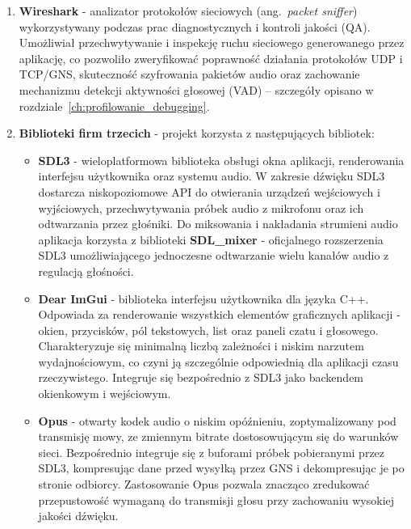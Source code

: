 \begin{enumerate}
	\item \textbf{Wireshark} \cite{wireshark_doc} - analizator protokołów sieciowych
	(ang.~\textit{packet sniffer}) wykorzystywany podczas prac diagnostycznych i kontroli
	jakości (QA). Umożliwiał przechwytywanie i inspekcję ruchu sieciowego generowanego
	przez aplikację, co pozwoliło zweryfikować poprawność działania protokołów UDP i TCP/GNS,
	skuteczność szyfrowania pakietów audio oraz zachowanie mechanizmu detekcji aktywności
	głosowej (VAD) -- szczegóły opisano w rozdziale~\ref{ch:profilowanie_debugging}.

	\item \textbf{Biblioteki firm trzecich} - projekt korzysta z następujących bibliotek:
	\begin{itemize}
		\item \textbf{SDL3} \cite{SDL3} - wieloplatformowa biblioteka obsługi okna aplikacji,
		renderowania interfejsu użytkownika oraz systemu audio. W zakresie dźwięku
		SDL3 dostarcza niskopoziomowe API do otwierania urządzeń wejściowych
		i wyjściowych, przechwytywania próbek audio z mikrofonu oraz ich odtwarzania
		przez głośniki. Do miksowania i nakładania strumieni audio aplikacja korzysta
		z biblioteki \textbf{SDL\_mixer} \cite{SDLMixer} - oficjalnego rozszerzenia SDL3
		umożliwiającego jednoczesne odtwarzanie wielu kanałów audio z regulacją głośności.
		
		\item \textbf{Dear ImGui} \cite{ImGui} - biblioteka interfejsu użytkownika
		dla języka C++. Odpowiada za renderowanie
		wszystkich elementów graficznych aplikacji - okien, przycisków, pól tekstowych,
		list oraz paneli czatu i głosowego. Charakteryzuje się minimalną liczbą
		zależności i niskim narzutem wydajnościowym, co czyni ją szczególnie
		odpowiednią dla aplikacji czasu rzeczywistego. Integruje się bezpośrednio
		z SDL3 jako backendem okienkowym i wejściowym.
		
		\item \textbf{Opus} \cite{OpusRFC} - otwarty kodek audio o niskim opóźnieniu,
		zoptymalizowany pod transmisję mowy, ze zmiennym bitrate dostosowującym się
		do warunków sieci. Bezpośrednio integruje się z buforami próbek pobieranymi
		przez SDL3, kompresując dane przed wysyłką przez GNS i dekompresując je
		po stronie odbiorcy. Zastosowanie Opus pozwala znacząco zredukować
		przepustowość wymaganą do transmisji głosu przy zachowaniu wysokiej jakości
		dźwięku.
		

\end{itemize}
\end{enumerate}
